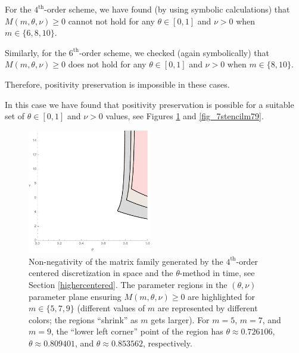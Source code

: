 \documentclass[a4paper]{article}
\newcommand{\te}{\theta}
\begin{document}
\begin{description}[style=unboxed,leftmargin=0cm]
\item [{Case 1:} $m$ is {even}.] For the $4^\text{th}$-order scheme, we have found (by using symbolic calculations) that $M(m,\theta,\nu)\ge 0$ cannot not hold for any $\theta\in[0,1]$ and $\nu>0$ when $m\in\{6,8,10\}$.

Similarly, for the $6^\text{th}$-order scheme, we checked (again symbolically) that $M(m,\theta,\nu)\ge 0$ does not hold for any $\theta\in[0,1]$ and $\nu>0$ when $m\in\{8,10\}$.

Therefore, positivity preservation is impossible in these cases.



\item [{Case 2:} $m$ is {odd}.] In this case we have found that positivity preservation is possible for a suitable set of $\theta\in[0,1]$ and $\nu>0$ values, see 
Figures \ref{fig_5stencilm579} and \ref{fig_7stencilm79}.
\end{description}

\begin{figure}
\begin{center}
\includegraphics[width=0.48\textwidth]{fig_5stencilm579.pdf}
\caption{Non-negativity of the matrix family generated by the $4^\text{th}$-order centered discretization in space and the $\theta$-method in time, see Section \ref{highercentered}. The parameter regions in the $(\te,\nu)$ parameter plane ensuring $M(m,\te,\nu)\ge 0$ are highlighted for $m\in\{5, 7, 9\}$ (different values of $m$ are represented by different colors; the regions ``shrink'' as $m$ gets larger). For $m=5$, $m=7$, and $m=9$, the ``lower left corner'' point of the region has $\theta\approx 0.726106$, $\theta\approx 0.809401$, and $\theta\approx 0.853562$, respectively.}\label{fig_5stencilm579}
\end{center}
\end{figure}
\end{document}
